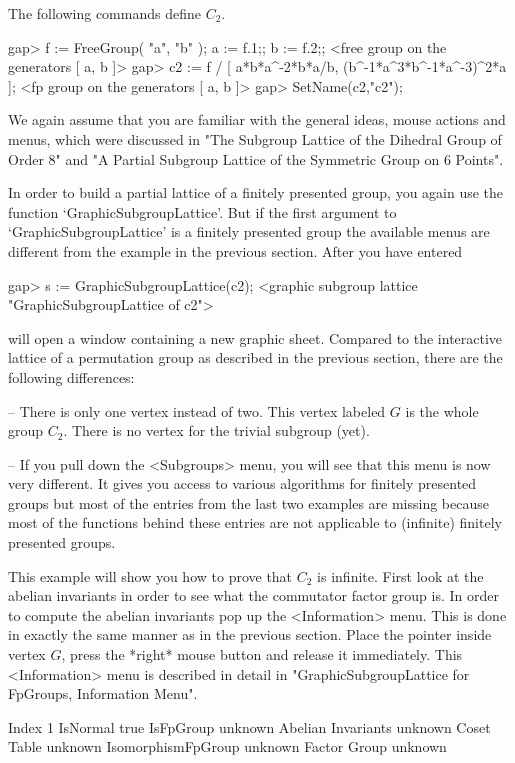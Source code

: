 The following {\GAP} commands define $C_2$.

\begintt
gap> f := FreeGroup( "a", "b" );  a := f.1;;  b := f.2;;
<free group on the generators [ a, b ]>
gap> c2 := f / [ a*b*a^-2*b*a/b, (b^-1*a^3*b^-1*a^-3)^2*a ];
<fp group on the generators [ a, b ]>
gap> SetName(c2,"c2");
\endtt

We again assume that you are familiar with the general ideas, mouse actions
and menus, which were discussed in "The Subgroup Lattice of the Dihedral
Group of Order 8" and "A Partial Subgroup Lattice of the Symmetric Group on
6 Points".

In order  to build a  partial lattice of a  finitely presented group, you
again use the function  `GraphicSubgroup\-Lattice'.  But if the first  argument
to `GraphicSubgroupLattice' is a finitely presented group the available menus
are different  from the example in  the previous section.  After you have
entered

\begintt
gap> s := GraphicSubgroupLattice(c2);
<graphic subgroup lattice "GraphicSubgroupLattice of c2">
\endtt

{\XGAP} will open a window containing a new graphic sheet.  Compared to the
interactive lattice of a permutation group as described in the previous
section, there are the following differences: 

-- There is only one vertex instead of two.  This vertex labeled $G$ is the
whole group $C_2$.  There is no vertex for the trivial subgroup (yet).

-- If you pull down the <Subgroups> menu, you will see  that this menu is
now   very different.   It gives  you   access to various algorithms  for
finitely presented  groups  but most of  the  entries  from the last  two
examples  are missing because most of  the {\GAP}  functions behind these
entries are not applicable to (infinite) finitely presented groups.

This  example will show  you how to prove that  $C_2$ is infinite.  First
look at the abelian invariants in order to see what the commutator factor
group is.   In  order  to  compute the abelian    invariants pop  up  the
<Information> menu.   This is done in exactly  the same manner  as in the
previous section.  Place the pointer inside vertex $G$, press the *right*
mouse button and release   it  immediately.  This <Information> menu   is
described  in   detail in  "GraphicSubgroupLattice  for FpGroups, Information
Menu".

\begintt
Index              1
IsNormal           true
IsFpGroup          unknown
Abelian Invariants unknown
Coset Table        unknown
IsomorphismFpGroup unknown
Factor Group       unknown 
\endtt

